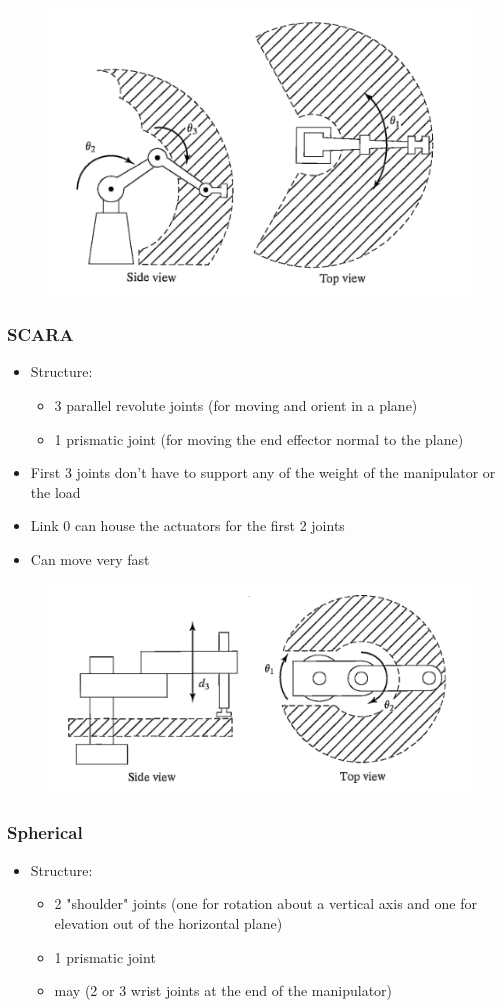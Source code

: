 \documentclass[10pt,a4paper]{article}
\begin{document}
\begin{figure}[H]
	\includegraphics[width=0.5\columnwidth]{imgs/man_articulated.png}
\end{figure}

\subsubsection{SCARA}
\begin{itemize}
	\item Structure:
	\begin{itemize}
		\item 3 parallel revolute joints (for moving and orient in a plane)
		\item 1 prismatic joint (for moving the end effector normal to the plane)
	\end{itemize}
	\item First 3 joints don't have to support any of the weight of the manipulator or the load
	\item Link 0 can house the actuators for the first 2 joints
	\item Can move very fast
\end{itemize}

\begin{figure}[H]
	\includegraphics[width=0.5\columnwidth]{imgs/man_scara.png}
\end{figure}

\subsubsection{Spherical}
\begin{itemize}
	\item Structure:
	\begin{itemize}
		\item 2 "shoulder" joints (one for rotation about a vertical axis and one for elevation out of the horizontal plane)
		\item 1 prismatic joint
		\item may (2 or 3 wrist joints at the end of the manipulator)
	\end{itemize}
\end{itemize}
\end{document}
